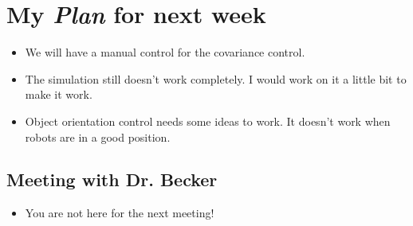 \section{My \emph{Plan} for next week}

\begin{itemize}
\item We will have a manual control for the covariance control.
\item The simulation still doesn't work completely. I would work on it a little bit to make it work.
\item Object orientation control needs some ideas to work. It doesn't work when robots are in a good position.
\end{itemize}

\subsection{Meeting with Dr. Becker  }

\begin{itemize}
\item You are not here for the next meeting!
\end{itemize}


